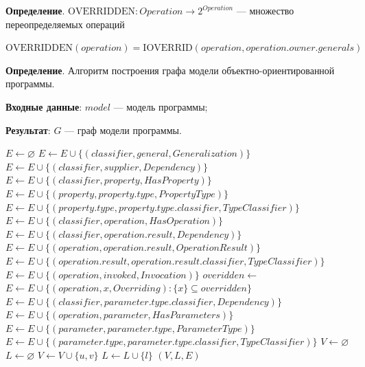 \textbf{Определение}. $\textrm{OVERRIDDEN}: Operation \to 2^{Operation}$
--- множество переопределяемых операций

$\textrm{OVERRIDDEN}(operation) = \textrm{IOVERRID}(operation, operation.owner.generals)$

\textbf{Определение}. Алгоритм построения графа модели объектно-ориентированной программы.

\textbf{Входные данные}: $model$ --- модель программы;

\textbf{Результат}: $G$ --- граф модели программы.

\begin{algorithmic}
    \State $E \gets \varnothing$
            \State $E \gets E \cup \{ ( classifier, general, Generalization ) \}$
        \EndFor
            \State $E \gets E \cup \{ ( classifier, supplier, Dependency ) \}$
        \EndFor
            \State $E \gets E \cup \{ ( classifier, property, HasProperty ) \}$
            \State $E \gets E \cup \{ ( property, property.type, PropertyType ) \}$
            \State $E \gets E \cup \{ ( property.type, property.type.classifier, TypeClassifier ) \}$
        \EndFor
            \State $E \gets E \cup \{ ( classifier, operation, HasOperation ) \}$
                \State $E \gets E \cup \{ ( classifier, operation.result, Dependency ) \}$
                \State $E \gets E \cup \{ ( operation, operation.result, OperationResult ) \}$
                \State $E \gets E \cup \{ ( operation.result, operation.result.classifier, TypeClassifier ) \}$
            \EndIf
                \State $E \gets E \cup \{ ( operation, invoked, Invocation ) \}$
            \EndFor
            \State $overidden \gets$ 
                \State $E \gets E \cup \{ ( operation, x, Overriding ) : \{ x \} \subseteq overridden \}$
            \EndIf
                \State $E \gets E \cup \{ ( classifier, parameter.type.classifier, Dependency ) \}$
                \State $E \gets E \cup \{ ( operation, parameter, HasParameters ) \}$
                \State $E \gets E \cup \{ ( parameter, parameter.type, ParameterType ) \}$
                \State $E \gets E \cup \{ ( parameter.type, parameter.type.classifier, TypeClassifier ) \}$
            \EndFor
        \EndFor
    \EndFor
    \State $V \gets \varnothing$
    \State $L \gets \varnothing$
        \State $V \gets V \cup \{ u, v \}$
        \State $L \gets L \cup \{ l \}$
    \EndFor
    \State \Return $(V, L, E)$
\EndFunction
\end{algorithmic}

